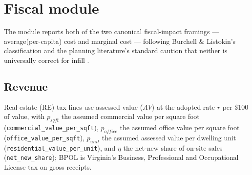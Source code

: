\documentclass[11pt]{article}
\newcommand{\assum}[1]{\texttt{#1}}
\begin{document}
\section{Fiscal module}

The module reports both of the two canonical fiscal-impact framings ---
average(per-capita) cost and marginal cost --- following Burchell \&
Listokin's classification \cite{burchell1978} and the planning literature's
standard caution that neither is universally correct for infill
\cite{kotval2006}.

\subsection{Revenue}
Real-estate (RE) tax lines use assessed value ($AV$) at the adopted rate $r$
per \$100 of value, with $p_{sqft}$ the assumed commercial value per square
foot (\assum{commercial\_value\_per\_sqft}), $p_{office}$ the assumed office
value per square foot (\assum{office\_value\_per\_sqft}), $p_{unit}$ the assumed
assessed value per dwelling unit (\assum{residential\_value\_per\_unit}), and
$\eta$ the net-new share of on-site sales (\assum{net\_new\_share}); BPOL is Virginia's Business,
Professional and Occupational License tax on gross receipts.
\end{document}

